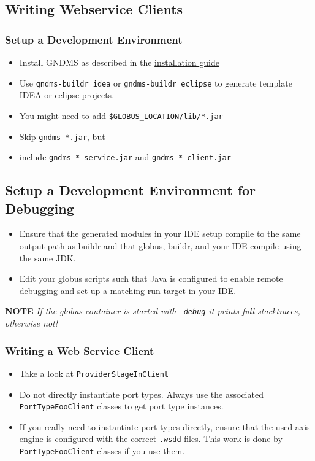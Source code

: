 \documentclass{article}
\begin{document}
\subsection{Writing Webservice Clients}

\subsubsection{Setup a Development Environment}

\begin{itemize}
\item
  Install GNDMS as described in the
  \href{../installation-guide}{installation guide}
\item
  Use \verb!gndms-buildr idea! or \verb!gndms-buildr eclipse! to
  generate template IDEA or eclipse projects.
\item
  You might need to add \verb!$GLOBUS_LOCATION/lib/*.jar!
\item
  Skip \verb!gndms-*.jar!, but
\item
  include \verb!gndms-*-service.jar! and \verb!gndms-*-client.jar!
\end{itemize}
\subsection{Setup a Development Environment for Debugging}

\begin{itemize}
\item
  Ensure that the generated modules in your IDE setup compile to the
  same output path as buildr and that globus, buildr, and your IDE
  compile using the same JDK.

\item
  Edit your globus scripts such that Java is configured to enable
  remote debugging and set up a matching run target in your IDE.

\end{itemize}
\textbf{NOTE}
\emph{If the globus container is started with \texttt{-debug} it prints full stacktraces, otherwise not!}

\subsubsection{Writing a Web Service Client}

\begin{itemize}
\item
  Take a look at \verb!ProviderStageInClient!
\item
  Do not directly instantiate port types. Always use the associated
  \verb!PortTypeFooClient! classes to get port type instances.
\item
  If you really need to instantiate port types directly, ensure that
  the used axis engine is configured with the correct \verb!.wsdd!
  files. This work is done by \verb!PortTypeFooClient! classes if you
  use them.
\end{itemize}
\end{document}
